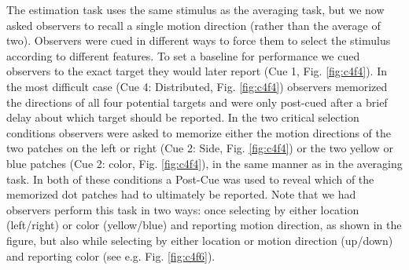 The estimation task uses the same stimulus as the averaging task, but we now asked observers to recall a single motion direction (rather than the average of two). Observers were cued in different ways to force them to select the stimulus according to different features. To set a baseline for performance we cued observers to the exact target they would later report (Cue 1, Fig. \ref{fig:c4f4}). In the most difficult case (Cue 4: Distributed, Fig. \ref{fig:c4f4}) observers memorized the directions of all four potential targets and were only post-cued after a brief delay about which target should be reported. In the two critical selection conditions observers were asked to memorize either the motion directions of the two patches on the left or right (Cue 2: Side, Fig. \ref{fig:c4f4}) or the two yellow or blue patches (Cue 2: color, Fig. \ref{fig:c4f4}), in the same manner as in the averaging task. In both of these conditions a Post-Cue was used to reveal which of the memorized dot patches had to ultimately be reported. Note that we had observers perform this task in two ways: once selecting by either location (left/right) or color (yellow/blue) and reporting motion direction, as shown in the figure, but also while selecting by either location or motion direction (up/down) and reporting color (see e.g. Fig. \ref{fig:c4f6}). 

